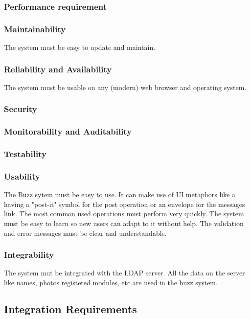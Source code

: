 \documentclass[12pt]{article}
\begin{document}
\subsubsection{Performance requirement}

\subsubsection{Maintainability} 
The system must be easy to update and maintain.
\subsubsection{Reliability and Availability} 
The system must be usable on any (modern) web browser and operating system.
\subsubsection{Security}

\subsubsection{Monitorability and Auditability}

\subsubsection{Testability}

\subsubsection{Usability}
The Buzz sytem must be easy to use. It can make use of UI metaphors like a having a "post-it" symbol for the post operation or an envelope for the messages link.
The most common used operations must perform very quickly. The system must be easy to learn so new users can adapt to it without help. 
The validation and error messages must be clear and understandable.
\subsubsection{Integrability} 
The system mut be integrated with the LDAP server. 
All the data on the server like names, photos registered modules, etc are used in the buzz system. 

\subsection{Integration Requirements}
\end{document}

